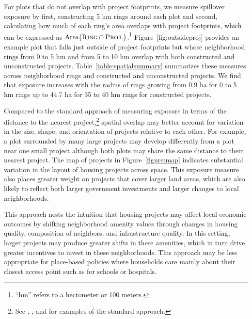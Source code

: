 \documentclass[12pt]{article}
\newcommand{\hmref}{
	``hm'' refers to a hectometer or 100 meters.
}
\begin{document}
For plots that do not overlap with project footprints, we measure spillover exposure by first, constructing 5 hm rings around each plot and second, calculating how much of each ring's area overlaps with project footprints, which can be expressed as $\text{Area}\big(\textsc{Ring}  \cap  \textsc{Proj.}\big)$.\footnote{\hmref}  Figure~\ref{fig:outsideproj} provides an example plot that falls just outside of project footprints but whose neighborhood rings from 0 to 5 hm and from 5 to 10 hm overlap with both constructed and unconstructed projects.  Table~\ref{table:spatialsummary} summarizes these measures across neighborhood rings and constructed and unconstructed projects.  We find that exposure increases with the radius of rings growing from 0.9 ha for 0 to 5 hm rings up to 44.7 ha for 35 to 40 hm rings for constructed projects.  

Compared to the standard approach of measuring exposure in terms of the distance to the nearest project,\footnote{See \cite{diamond2016wants}, \cite{rossi2010housing}, and \cite{neumark2015place} for examples of the standard approach.} spatial overlap may better account for variation in the size, shape, and orientation of projects relative to each other.  For example, a plot surrounded by many large projects may develop differently from a plot near one small project although both plots may share the same distance to their nearest project.  The map of projects in Figure~\ref{figure:map} indicates substantial variation in the layout of housing projects across space.  This exposure measure also places greater weight on projects that cover larger land areas, which are also likely to reflect both larger government investments and larger changes to local neighborhoods.

This approach nests the intuition that housing projects may affect local economic outcomes by shifting neighborhood amenity values through changes in housing quality, composition of neighbors, and infrastructure quality.  In this setting, larger projects may produce greater shifts in these amenities, which in turn drive greater incentives to invest in these neighborhoods.  This approach may be less appropriate for place-based policies where households care mainly about their closest access point such as for schools or hospitals.  
\end{document}

